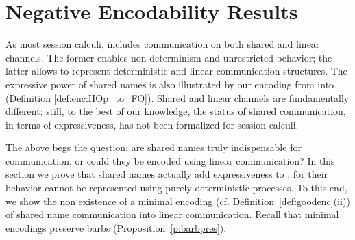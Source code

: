 \section{Negative Encodability Results}\label{s:negative}

%

As most session calculi, 
\HOp includes communication on both shared and linear channels.
The former enables non determinism and unrestricted behavior; the latter allows to represent
deterministic and linear communication structures.
The expressive power of shared names is also illustrated by our 
encoding from \HOp into \sessp (Definition \ref{def:enc:HOp_to_FO}).
Shared and linear channels are fundamentally different; still, to the best of our knowledge,
the status of shared communication, in terms of expressiveness, has not been formalized for session calculi.

The above begs the question: are shared names truly indispensable for communication, or could they
be encoded using linear communication?
In this section we prove that shared names actually add expressiveness to \HOp,
for their behavior cannot be represented using purely deterministic processes.
To this end, we show the non existence of a minimal encoding 
(cf. Definition~\ref{def:goodenc}(ii))
of shared name communication into linear 
communication. Recall that minimal encodings preserve barbs (Proposition~\ref{p:barbpres}).

%
%
%




